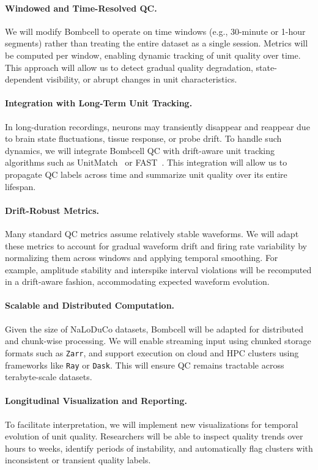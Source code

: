 \paragraph{Windowed and Time-Resolved QC.}
We will modify Bombcell to operate on time windows (e.g., 30-minute or 1-hour segments) rather than treating the entire dataset as a single session. Metrics will be computed per window, enabling dynamic tracking of unit quality over time. This approach will allow us to detect gradual quality degradation, state-dependent visibility, or abrupt changes in unit characteristics.

\paragraph{Integration with Long-Term Unit Tracking.}
In long-duration recordings, neurons may transiently disappear and reappear due to brain state fluctuations, tissue response, or probe drift. To handle such dynamics, we will integrate Bombcell QC with drift-aware unit tracking algorithms such as UnitMatch~\citep{vanBeestEtAl24} or FAST~\citep{dhawaleEtAl17}. This integration will allow us to propagate QC labels across time and summarize unit quality over its entire lifespan.

\paragraph{Drift-Robust Metrics.}
Many standard QC metrics assume relatively stable waveforms. We will adapt these metrics to account for gradual waveform drift and firing rate variability by normalizing them across windows and applying temporal smoothing. For example, amplitude stability and interspike interval violations will be recomputed in a drift-aware fashion, accommodating expected waveform evolution.

\paragraph{Scalable and Distributed Computation.}
Given the size of NaLoDuCo datasets, Bombcell will be adapted for distributed and chunk-wise processing. We will enable streaming input using chunked storage formats such as \texttt{Zarr}, and support execution on cloud and HPC clusters using frameworks like \texttt{Ray} or \texttt{Dask}. This will ensure QC remains tractable across terabyte-scale datasets.

\paragraph{Longitudinal Visualization and Reporting.}
To facilitate interpretation, we will implement new visualizations for temporal evolution of unit quality. Researchers will be able to inspect quality trends over hours to weeks, identify periods of instability, and automatically flag clusters with inconsistent or transient quality labels.


